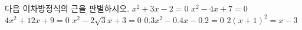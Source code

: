 다음 이차방정식의 근을 판별하시오.
 $x^2+3x-2=0$
 $x^2-4x+7=0$
 $4x^2+12x+9=0$
 $x^2-2\sqrt{3}x+3=0$
 $0.3x^2-0.4x-0.2=0$
 $2(x+1)^2=x-3$
